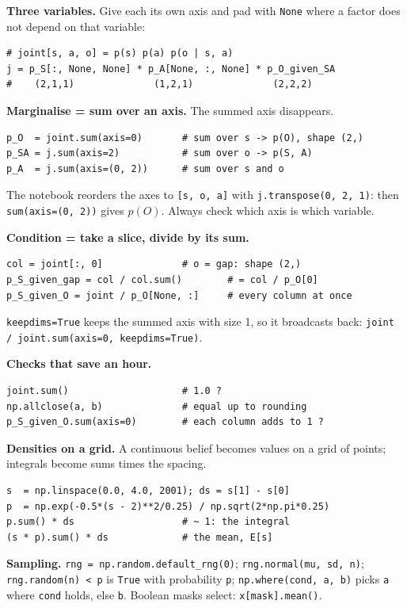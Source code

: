 \documentclass[10pt]{article}
\begin{document}
\textbf{Three variables.} Give each its own axis and pad with \texttt{None} where a
factor does not depend on that variable:
\begin{lstlisting}
# joint[s, a, o] = p(s) p(a) p(o | s, a)
j = p_S[:, None, None] * p_A[None, :, None] * p_O_given_SA
#    (2,1,1)              (1,2,1)              (2,2,2)
\end{lstlisting}

\textbf{Marginalise = sum over an axis.} The summed axis disappears.
\begin{lstlisting}
p_O  = joint.sum(axis=0)       # sum over s -> p(O), shape (2,)
p_SA = j.sum(axis=2)           # sum over o -> p(S, A)
p_A  = j.sum(axis=(0, 2))      # sum over s and o
\end{lstlisting}
The notebook reorders the axes to \texttt{[s, o, a]} with \texttt{j.transpose(0, 2, 1)}: then
\texttt{sum(axis=(0, 2))} gives $p(O)$. Always check which axis is which variable.

\textbf{Condition = take a slice, divide by its sum.}
\begin{lstlisting}
col = joint[:, 0]              # o = gap: shape (2,)
p_S_given_gap = col / col.sum()        # = col / p_O[0]
p_S_given_O = joint / p_O[None, :]     # every column at once
\end{lstlisting}
\texttt{keepdims=True} keeps the summed axis with size 1, so it broadcasts back:
\texttt{joint / joint.sum(axis=0, keepdims=True)}.

\textbf{Checks that save an hour.}
\begin{lstlisting}
joint.sum()                    # 1.0 ?
np.allclose(a, b)              # equal up to rounding
p_S_given_O.sum(axis=0)        # each column adds to 1 ?
\end{lstlisting}

\textbf{Densities on a grid.} A continuous belief becomes values on a grid of points;
integrals become sums times the spacing.
\begin{lstlisting}
s  = np.linspace(0.0, 4.0, 2001); ds = s[1] - s[0]
p  = np.exp(-0.5*(s - 2)**2/0.25) / np.sqrt(2*np.pi*0.25)
p.sum() * ds                   # ~ 1: the integral
(s * p).sum() * ds             # the mean, E[s]
\end{lstlisting}

\textbf{Sampling.} \texttt{rng = np.random.default\_rng(0)}; \texttt{rng.normal(mu, sd, n)};
\texttt{rng.random(n) < p} is \texttt{True} with probability \texttt{p};
\texttt{np.where(cond, a, b)} picks \texttt{a} where \texttt{cond} holds, else \texttt{b}.
Boolean masks select: \texttt{x[mask].mean()}.
\end{document}
